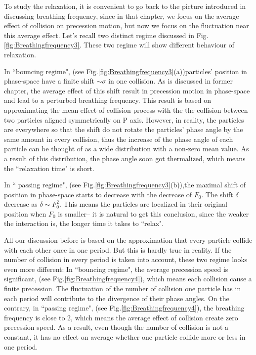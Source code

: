 \documentclass[aps,pre,twocolumn
,groupedaddress]{revtex4-1}
\begin{document}
To study the relaxation, it is convenient to go back to the picture introduced in discussing breathing frequency, since in that chapter, we focus on the average effect of collision on precession motion, but now we focus on the fluctuation near this average effect. Let's recall two distinct regime discussed in Fig.\ref{fig:Breathingfrequency3}. These two regime will show different behaviour of relaxation.

In ``bouncing regime", (see Fig.\ref{fig:Breathingfrequency3}(a))particles' position in phase-space have a finite shift $\sim\sigma$ in one collision. As is discussed in former chapter, the average effect of this shift result in precession motion in phase-space and lead to a perturbed breathing frequency. This result is based on approximating the mean effect of collision process with the the collision between two particles aligned symmetrically on P axis. However, in reality, the particles 
are everywhere so that the shift do not rotate the particles' phase angle by the same amount in every collision, thus the increase of the phase angle of each particle can be thought of as a wide distribution with a non-zero mean value. As a result of this distribution, the phase angle soon got thermalized, which means the ``relaxation time" is short.

In `` passing regime", (see Fig.\ref{fig:Breathingfrequency3}(b)),the maximal shift of position in phase-space starts to decrease with the decrease of $F_0$. The shift $\delta$ decrease as $\delta\sim F_0^2$. This means the particles are localized in their original position when $F_0$ is smaller-- it is natural to get this conclusion, since the weaker the interaction is, the longer time it takes to ``relax".

All our discussion before is based on the approximation that every particle collide with each other once in one period. But this is hardly true in reality. If the number of collision in every period is taken into account, these two regime looks even more different: In ``bouncing regime", the average precession speed is significant, (see Fig.\ref{fig:Breathingfrequency4}), which means each collision cause a finite precession. The fluctuation of the number of collision one particle has in each period will contribute to the divergence of their phase angles. On the contrary, in ``passing regime", (see Fig.\ref{fig:Breathingfrequency4}), the breathing frequency is close to 2, which means the average effect of collision create zero precession speed. As a result, even though the number of collision is not a constant, it has no effect on average whether one particle collide more or less in one period. 
\end{document}
